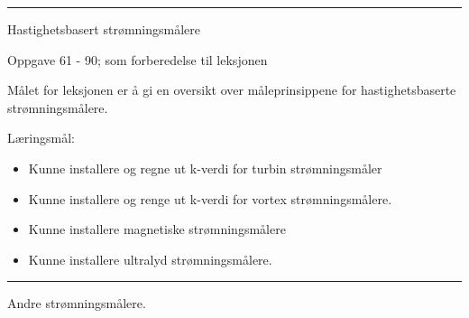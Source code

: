 \documentclass[12pt,a4paper]{article}
\begin{document}
\filbreak
\hrule \vskip 5pt

\noindent {}

\vskip 5pt



\vskip 2pt  Hastighetsbasert strømningsmålere

\vskip 2pt \noindent Oppgave 61 - 90;  som forberedelse til leksjonen%


Målet for leksjonen er å gi en oversikt over måleprinsippene for hastighetsbaserte strømningsmålere.

	Læringsmål:
	\begin{itemize}[noitemsep]
		\item Kunne installere og regne ut k-verdi for turbin strømningsmåler
		\item Kunne installere og renge ut k-verdi for vortex strømningsmålere. 
		\item Kunne installere magnetiske strømningsmålere
		\item Kunne installere ultralyd strømningsmålere. 
	\end{itemize}

%

\filbreak
\hrule \vskip 5pt
\noindent {} 

\vskip 5pt


\vskip 2pt  Andre strømningsmålere. 
\end{document}
